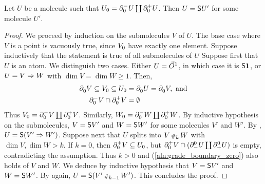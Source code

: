 \begin{lem} \label{lem:has_two_point_is_susp}
    Let \( U \) be a molecule such that \( \gr{0}{U} = \bd{0}{-} U \coprod \bd{0}{+} U \).
    Then \( U = \sus{U'} \) for some molecule \( U' \).
\end{lem}
\begin{proof}
    We proceed by induction on the submolecules \( V \) of \( U \).
    The base case where \( V \) is a point is vacuously true, since \( \gr{0}{V} \) have exactly one element.
    Suppose inductively that the statement is true of all submolecules of \( U \)
    Suppose first that \( U \) is an atom.
    We distinguish two cases.
    Either \( U = \dglobe{1} \), in which case it is \( \sus{\pt} \), or \( U = V \celto W \) with \( \dim V = \dim W \geq 1 \).
    Then, 
    \begin{align} 
         \bd{0}{} V \subseteq \gr{0}{V} \subseteq \gr{0}{U} &= \bd{0}{} U = \bd{0}{} V, \text{ and} \nonumber\\
         \bd{0}{-} V \cap \bd{0}{+} V &= \emptyset \label{aln:grade_boundary_zero}
    \end{align}
    Thus \( \gr{0}{V} = \bd{0}{-} V \coprod \bd{0}{+} V\).
    Similarly, \( \gr{0}{W} = \bd{0}{-} W \coprod \bd{0}{+} W \).
    By inductive hypothesis on the submolecules, \( V = \sus{V'} \) and \( W = \sus{W'} \) for some molecules \( V' \) and \( W' \).
    By \cite[Proposition 7.3.16]{hadzihasanovic2024combinatorics}, \( U = \sus{(V' \celto W')} \).
    Suppose next that \( U \) splits into \( V \cp{k} W \) with \( \dim V, \dim W > k \).
    If \( k = 0 \), then \( \bd{0}{+} V \subseteq \gr{0}{U} \), but \( \bd{0}{+} V \cap (\bd{-}{0} U \coprod \bd{+}{0} U) \) is empty, contradicting the assumption.
    Thus \( k > 0 \) and (\ref{aln:grade_boundary_zero}) also holds of \( V \) and \( W \).
    We deduce by inductive hypothesis that \( V = \sus{V'} \) and \( W = \sus{W'} \).
    By \cite[Proposition 7.3.16]{hadzihasanovic2020diagrammatic} again, \( U = \sus{(V' \cp{k - 1} W')} \).
    This concludes the proof.
\end{proof}

